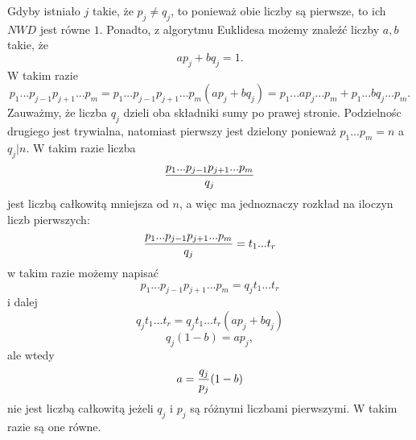 Gdyby istniało $j$ takie, że $p_j\neq q_j$, to ponieważ obie liczby są pierwsze, to ich $NWD$ jest równe $1$. Ponadto, z algorytmu Euklidesa możemy znaleźć liczby $a, b$ takie, że
$$ap_j+bq_j=1.$$
W takim razie
$$p_1...p_{j-1}p_{j+1}...p_m=p_1...p_{j-1}p_{j+1}...p_m(ap_j+bq_j)=p_1...ap_j...p_m+p_1...bq_j...p_m.$$
Zauważmy, że liczba $q_j$ dzieli oba składniki sumy po prawej stronie. Podzielnośc drugiego jest trywialna, natomiast pierwszy jest dzielony ponieważ $p_1...p_m=n$ a $q_j|n$. W takim razie liczba
$${p_1...p_{j-1}p_{j+1}...p_m\over q_j}$$
jest liczbą całkowitą mniejsza od $n$, a więc ma jednoznaczy rozkład na iloczyn liczb pierwszych:
$${p_1...p_{j-1}p_{j+1}...p_m\over q_j}=t_1...t_r$$
w takim razie możemy napisać
$$p_1...p_{j-1}p_{j+1}...p_m = q_jt_1...t_r$$
i dalej
$$q_jt_1...t_r=q_jt_1...t_r(ap_j+bq_j)$$
$$q_j(1-b)=ap_j,$$
ale wtedy
$$a={q_j\over p_j}(1-b)$$
nie jest liczbą całkowitą jeżeli $q_j$ i $p_j$ są różnymi liczbami pierwszymi. W takim razie są one równe.